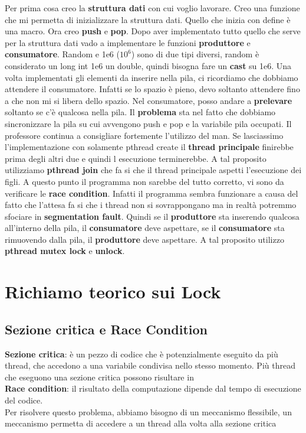 \documentclass{article}
\begin{document}
\noindent
Per prima cosa creo la \textbf{struttura dati} con cui voglio lavorare. Creo una funzione che mi permetta di inizializzare la struttura dati. Quello che inizia con define è una macro. Ora creo \textbf{push} e \textbf{pop}. Dopo aver implementato tutto quello che serve per la struttura dati vado a implementare le funzioni \textbf{produttore} e \textbf{consumatore}. Random e 1e6 ($10^6$) sono di due tipi diversi, random è considerato un long int 1e6 un double, quindi bisogna fare un \textbf{cast} su 1e6. Una volta implementati gli elementi da inserire nella pila, ci ricordiamo che dobbiamo attendere il consumatore. Infatti se lo spazio è pieno, devo soltanto attendere fino a che non mi si libera dello spazio. Nel consumatore, posso andare a \textbf{prelevare} soltanto se c'è qualcosa nella pila. Il \textbf{problema} sta nel fatto che dobbiamo sincronizzare la pila su cui avvengono push e pop e la variabile pila occupati. Il professore continua a consigliare fortemente l'utilizzo del man. Se lasciassimo l'implementazione con solamente pthread create il \textbf{thread principale} finirebbe prima degli altri due e quindi l esecuzione terminerebbe. A tal proposito utilizziamo \textbf{pthread join} che fa si che il thread principale aspetti l'esecuzione dei figli. A questo punto il programma non sarebbe del tutto corretto, vi sono da verificare le \textbf{race condition}. Infatti il programma sembra funzionare a causa del fatto che l'attesa fa si che i thread non si sovrappongano ma in realtà potremmo sfociare in \textbf{segmentation fault}. Quindi se il \textbf{produttore} sta inserendo qualcosa all'interno della pila, il \textbf{consumatore} deve aspettare, se il \textbf{consumatore} sta rimuovendo dalla pila, il \textbf{produttore} deve aspettare. A tal proposito utilizzo \textbf{pthread mutex lock} e \textbf{unlock}.
\section{Richiamo teorico sui Lock}
\subsection{Sezione critica e Race Condition}
\textbf{Sezione critica}: è un pezzo di codice che è potenzialmente eseguito da più thread, che accedono a una variabile condivisa nello stesso momento. Più thread che eseguono una sezione critica possono risultare in\\
\textbf{Race condition}: il risultato della computazione dipende dal tempo di esecuzione del codice.\\
Per risolvere questo problema, abbiamo bisogno di un meccanismo flessibile, un meccanismo permetta di accedere a un thread alla volta alla sezione critica
\end{document}
